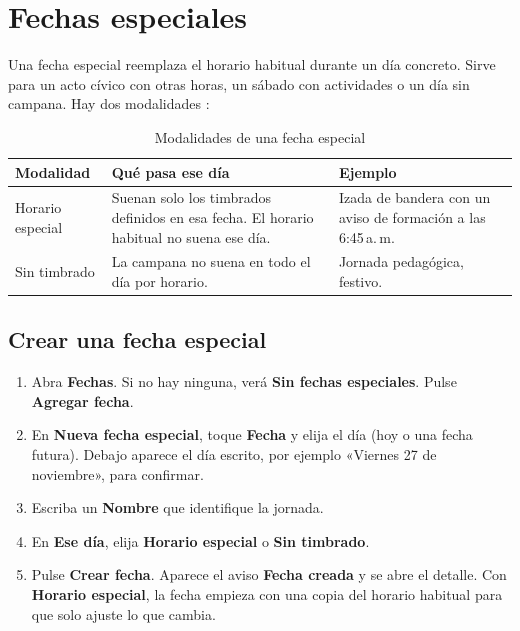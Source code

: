 \documentclass[a4paper,11pt]{article}
\newcommand{\boton}[1]{\textbf{#1}}
\begin{document}
\clearpage
\section{Fechas especiales}
\label{sec:fecha}
Una fecha especial reemplaza el horario habitual durante un día concreto. Sirve para un acto cívico con otras horas, un sábado con actividades o un día sin campana. Hay dos modalidades \cite{repo,firmware}:

\begin{table}[H]
\centering\small
\caption{Modalidades de una fecha especial}
\begin{tabularx}{\linewidth}{@{}P{3.4cm}YY@{}}
\toprule
\textbf{Modalidad} & \textbf{Qué pasa ese día} & \textbf{Ejemplo} \\
\midrule
Horario especial & Suenan solo los timbrados definidos en esa fecha. El horario habitual no suena ese día. & Izada de bandera con un aviso de formación a las 6:45\,a.\,m. \\
Sin timbrado & La campana no suena en todo el día por horario. & Jornada pedagógica, festivo. \\
\bottomrule
\end{tabularx}
\end{table}

\subsection{Crear una fecha especial}
\begin{enumerate}
  \item Abra \textbf{Fechas}. Si no hay ninguna, verá \textbf{Sin fechas especiales}. Pulse \boton{Agregar fecha}.
  \item En \textbf{Nueva fecha especial}, toque \textbf{Fecha} y elija el día (hoy o una fecha futura). Debajo aparece el día escrito, por ejemplo «Viernes 27 de noviembre», para confirmar.
  \item Escriba un \textbf{Nombre} que identifique la jornada.
  \item En \textbf{Ese día}, elija \boton{Horario especial} o \boton{Sin timbrado}.
  \item Pulse \boton{Crear fecha}. Aparece el aviso \textbf{Fecha creada} y se abre el detalle. Con \textbf{Horario especial}, la fecha empieza con una copia del horario habitual para que solo ajuste lo que cambia.
\end{enumerate}
\end{document}
